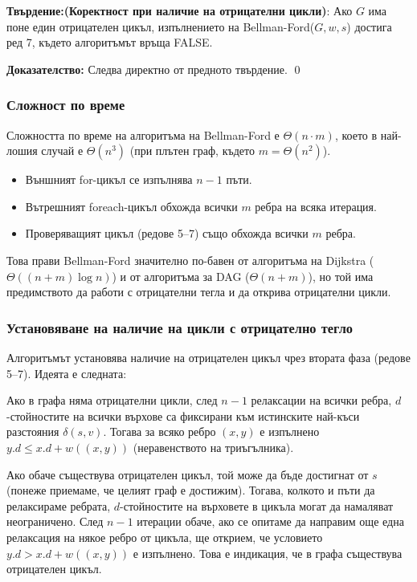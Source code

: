 \documentclass{article}
\renewcommand{\\}{\newline}
\newcommand{\tv}{\textbf{Твърдение:\;}}
\newcommand{\doc}{\textbf{Доказателство: }}
\begin{document}
\tv \textbf{(Коректност при наличие на отрицателни цикли)}:
Ако \(G\) има поне един отрицателен цикъл, изпълнението на Bellman-Ford(\(G, w, s\)) достига ред 7, където алгоритъмът връща FALSE.

\doc
Следва директно от предното твърдение. \qed

\subsubsection{Сложност по време}

Сложността по време на алгоритъма на Bellman-Ford е \(\Theta(n \cdot m)\), което в най-лошия случай е \(\Theta(n^3)\) (при плътен граф, където \(m = \Theta(n^2)\)).

\begin{itemize}
\item Външният for-цикъл се изпълнява \(n-1\) пъти.
\item Вътрешният foreach-цикъл обхожда всички \(m\) ребра на всяка итерация.
\item Проверяващият цикъл (редове 5–7) също обхожда всички \(m\) ребра.
\end{itemize}

Това прави Bellman-Ford значително по-бавен от алгоритъма на Dijkstra (\(\Theta((n+m)\log n)\)) и от алгоритъма за DAG (\(\Theta(n+m)\)), но той има предимството да работи с отрицателни тегла и да открива отрицателни цикли.

\subsubsection{Установяване на наличие на цикли с отрицателно тегло}

Алгоритъмът установява наличие на отрицателен цикъл чрез втората фаза (редове 5–7). Идеята е следната:

Ако в графа няма отрицателни цикли, след \(n-1\) релаксации на всички ребра, \(d\)-стойностите на всички върхове са фиксирани към истинските най-къси разстояния \(\delta(s, v)\). Тогава за всяко ребро \((x, y)\) е изпълнено \(y.d \le x.d + w((x, y))\) (неравенството на триъгълника).

Ако обаче съществува отрицателен цикъл, той може да бъде достигнат от \(s\) (понеже приемаме, че целият граф е достижим). Тогава, колкото и пъти да релаксираме ребрата, \(d\)-стойностите на върховете в цикъла могат да намаляват неограничено. След \(n-1\) итерации обаче, ако се опитаме да направим още една релаксация на някое ребро от цикъла, ще открием, че условието \(y.d > x.d + w((x, y))\) е изпълнено. Това е индикация, че в графа съществува отрицателен цикъл.
\end{document}

